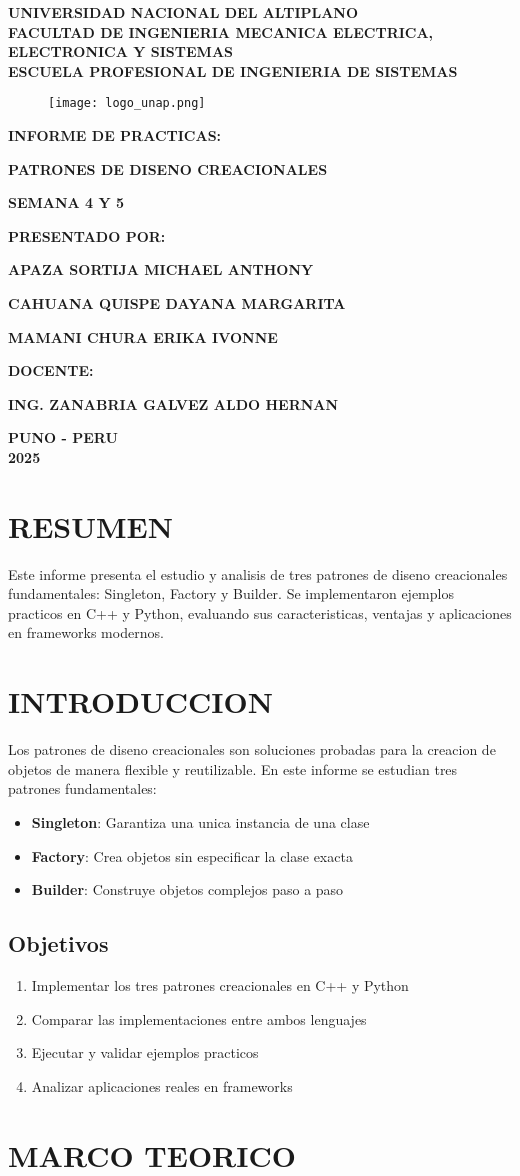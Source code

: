 \documentclass[11pt,a4paper]{article}
\newcommand{\Institution}{Universidad Nacional del Altiplano\xspace}
\renewcommand{\maketitle}
{
    \thispagestyle{empty}
    \begin{center}
        {\fontsize{18pt}{1em} \textbf{\MakeUppercase{\Institution}}}\\
        \vspace*{0.34cm}
        {\fontsize{16pt}{1em} \textbf{\MakeUppercase{Facultad de Ingenieria Mecanica Electrica, Electronica y Sistemas}}}\\
        \vspace*{0.34cm}
        {\fontsize{14pt}{1em} \textbf{\MakeUppercase{Escuela Profesional de Ingenieria de Sistemas}}}\\
    \end{center}        
    \vspace*{1.2cm}
    
    \begin{figure}[h]
    \center
    \texttt{[image: logo\_unap.png]}
    \end{figure}

    \begin{center}
        \vspace*{1.05cm}
        {\fontsize{14pt}{1em} \textbf {INFORME DE PRACTICAS:} \par}
        \vspace*{0.6cm}
        \begin{spacing}{1.5}
        {\fontsize{14pt}{1em} \textbf {PATRONES DE DISENO CREACIONALES} \par}
        {\fontsize{14pt}{1em} \textbf {SEMANA 4 Y 5} \par}
        \end{spacing}
        \vspace*{1.05cm}
        {\fontsize{14pt}{1em} \textbf {PRESENTADO POR:}\par}
        \vspace*{0.45cm}
        {\fontsize{14pt}{1em} \textbf {APAZA SORTIJA MICHAEL ANTHONY} \par}
        {\fontsize{14pt}{1em} \textbf {CAHUANA QUISPE DAYANA MARGARITA} \par}
        {\fontsize{14pt}{1em} \textbf {MAMANI CHURA ERIKA IVONNE} \par}
        \vspace*{0.6cm}
        {\fontsize{14pt}{1em} \textbf{DOCENTE:} \par}
        \vspace*{0.6cm}
        {\fontsize{16pt}{1em} \textbf{\MakeUppercase{Ing. Zanabria Galvez Aldo Hernan}} \par}
        \vspace*{1.05cm}
        {\fontsize{14pt}{1em} \textbf{PUNO - PERU}}\\
        \vspace*{0.45cm}
        {\fontsize{14pt}{1em} \textbf{2025}}
    \end{center}
    
    \pagebreak
}
\begin{document}
\maketitle

\newpage
\setcounter{page}{1}

\section*{RESUMEN}

Este informe presenta el estudio y analisis de tres patrones de diseno creacionales fundamentales: Singleton, Factory y Builder. Se implementaron ejemplos practicos en C++ y Python, evaluando sus caracteristicas, ventajas y aplicaciones en frameworks modernos.

\section{INTRODUCCION}

Los patrones de diseno creacionales son soluciones probadas para la creacion de objetos de manera flexible y reutilizable. En este informe se estudian tres patrones fundamentales:

\begin{itemize}
    \item \textbf{Singleton}: Garantiza una unica instancia de una clase
    \item \textbf{Factory}: Crea objetos sin especificar la clase exacta
    \item \textbf{Builder}: Construye objetos complejos paso a paso
\end{itemize}

\subsection{Objetivos}

\begin{enumerate}
    \item Implementar los tres patrones creacionales en C++ y Python
    \item Comparar las implementaciones entre ambos lenguajes
    \item Ejecutar y validar ejemplos practicos
    \item Analizar aplicaciones reales en frameworks
\end{enumerate}

\section{MARCO TEORICO}
\end{document}
